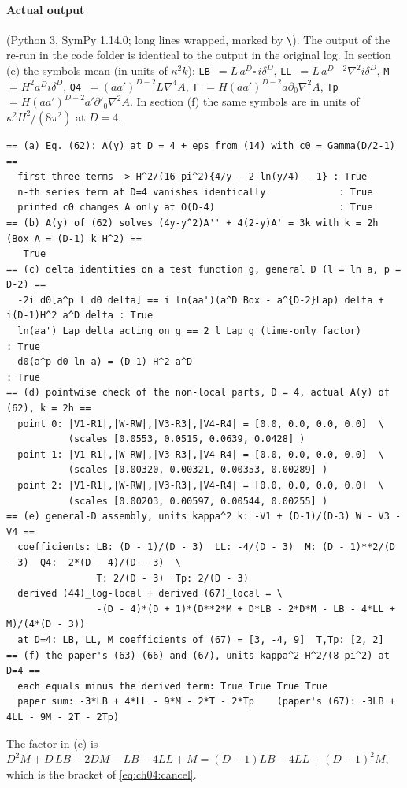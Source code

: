 \paragraph{Actual output} (Python 3, SymPy 1.14.0; long lines wrapped, marked by \texttt{\textbackslash}).
The output of the re-run in the code folder is identical to the output in the original log.
In section (e) the symbols mean (in units of $\kappa^2k$):
\texttt{LB}~$=L\,a^D\square\,i\delta^D$, \texttt{LL}~$=L\,a^{D-2}\nabla^2i\delta^D$, \texttt{M}~$=H^2a^Di\delta^D$,
\texttt{Q4}~$=(aa')^{D-2}L\nabla^4A$, \texttt{T}~$=H(aa')^{D-2}a\partial_0\nabla^2A$, \texttt{Tp}~$=H(aa')^{D-2}a'\partial'_0\nabla^2A$.
In section (f) the same symbols are in units of $\kappa^2H^2/(8\pi^2)$ at $D=4$.
{\scriptsize
\begin{verbatim}
== (a) Eq. (62): A(y) at D = 4 + eps from (14) with c0 = Gamma(D/2-1) ==
  first three terms -> H^2/(16 pi^2){4/y - 2 ln(y/4) - 1} : True
  n-th series term at D=4 vanishes identically             : True
  printed c0 changes A only at O(D-4)                      : True
== (b) A(y) of (62) solves (4y-y^2)A'' + 4(2-y)A' = 3k with k = 2h  (Box A = (D-1) k H^2) ==
   True
== (c) delta identities on a test function g, general D (l = ln a, p = D-2) ==
  -2i d0[a^p l d0 delta] == i ln(aa')(a^D Box - a^{D-2}Lap) delta + i(D-1)H^2 a^D delta : True
  ln(aa') Lap delta acting on g == 2 l Lap g (time-only factor)        : True
  d0(a^p d0 ln a) = (D-1) H^2 a^D                                      : True
== (d) pointwise check of the non-local parts, D = 4, actual A(y) of (62), k = 2h ==
  point 0: |V1-R1|,|W-RW|,|V3-R3|,|V4-R4| = [0.0, 0.0, 0.0, 0.0]  \
           (scales [0.0553, 0.0515, 0.0639, 0.0428] )
  point 1: |V1-R1|,|W-RW|,|V3-R3|,|V4-R4| = [0.0, 0.0, 0.0, 0.0]  \
           (scales [0.00320, 0.00321, 0.00353, 0.00289] )
  point 2: |V1-R1|,|W-RW|,|V3-R3|,|V4-R4| = [0.0, 0.0, 0.0, 0.0]  \
           (scales [0.00203, 0.00597, 0.00544, 0.00255] )
== (e) general-D assembly, units kappa^2 k: -V1 + (D-1)/(D-3) W - V3 - V4 ==
  coefficients: LB: (D - 1)/(D - 3)  LL: -4/(D - 3)  M: (D - 1)**2/(D - 3)  Q4: -2*(D - 4)/(D - 3)  \
                T: 2/(D - 3)  Tp: 2/(D - 3)
  derived (44)_log-local + derived (67)_local = \
                -(D - 4)*(D + 1)*(D**2*M + D*LB - 2*D*M - LB - 4*LL + M)/(4*(D - 3))
  at D=4: LB, LL, M coefficients of (67) = [3, -4, 9]  T,Tp: [2, 2]
== (f) the paper's (63)-(66) and (67), units kappa^2 H^2/(8 pi^2) at D=4 ==
  each equals minus the derived term: True True True True
  paper sum: -3*LB + 4*LL - 9*M - 2*T - 2*Tp    (paper's (67): -3LB + 4LL - 9M - 2T - 2Tp)
\end{verbatim}
}
\noindent
The factor in (e) is $D^2M+D\,LB-2DM-LB-4LL+M=(D-1)LB-4LL+(D-1)^2M$, which is the bracket of \eqref{eq:ch04:cancel}.

